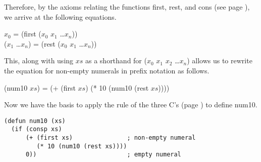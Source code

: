 Therefore, by the axioms relating the functions first, rest, and cons
(see page \pageref{first-rest-cons}),
we arrive at the following equations.
\begin{center}
$x_0$ =  (first ($x_0$ $x_1$ \dots $x_{n}$)) \\
($x_1$ \dots $x_{n}$) = (rest ($x_0$ $x_1$ \dots $x_{n}$))
\end{center}

This, along with using $xs$ as a shorthand for ($x_0$ $x_1$ $x_2$ \dots $x_{n}$)
allows us to rewrite the equation for non-empty numerals in prefix notation as follows.
\begin{center}
(num10 $xs$) = (+ (first $xs$) (* 10 (num10 (rest $xs$))))
\end{center}

Now we have the basis to apply the rule of the three C's
(page \pageref{fig:inductive-def-keys}) to define num10.

\begin{lstlisting}
(defun num10 (xs)
  (if (consp xs)
      (+ (first xs)               ; non-empty numeral
         (* 10 (num10 (rest xs))))
      0))                         ; empty numeral
\end{lstlisting}





